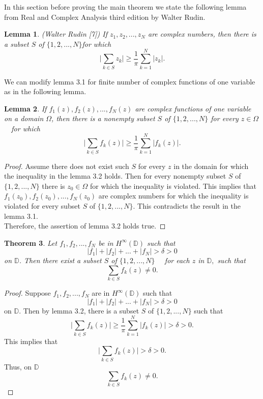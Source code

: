 \documentclass[reqno, 12pt]{amsart}
\newtheorem{theorem}{Theorem}[section]
\newtheorem{lemma}[theorem]{Lemma}
\theoremstyle{definition}
\theoremstyle{definition}
\begin{document}
In this section before proving the main theorem we state the following lemma from Real and Complex Analysis third edition by Walter Rudin. 
\begin{lemma}(Walter Rudin [7])
If $z_1, z_2, ..., z_N$ are complex numbers, then there is a subset $S$ of $ \{1, 2, ..., N\}$for which $$\lvert \sum_{k\in S}z_k\rvert \geq \frac{1}{\pi}\sum_{k=1}^N \lvert z_k\rvert.$$
\end{lemma}
We can modify lemma 3.1 for finite number of complex functions of one variable as in the following lemma.
\begin{lemma}
If $f_1(z), f_2(z),..., f_N(z)$ are complex functions of one variable on a domain $\Omega$, then there is a nonempty subset $S$ of $\{1, 2, ..., N\}$ for every $z\in\Omega$ ~~for which $$\lvert \sum_{k\in S}f_k(z)\rvert \geq \frac{1}{\pi}\sum_{k=1}^N \lvert f_k(z)\rvert.$$
\end{lemma}
\begin{proof}
Assume there does not exist such $S$ for every $z$ in the domain for which the inequality in the lemma 3.2 holds. Then for every nonempty subset $S$  of $\{1, 2, ..., N\}$ there is $z_0\in\Omega$ for which the inequality is violated. This implies that $f_1(z_0), f_2(z_0),..., f_N(z_0) $ are complex numbers for which the inequality is violated for every subset $S$ of $\{1, 2, ..., N\}.$
This contradicts the result in the lemma 3.1.\\
 Therefore, the assertion of lemma 3.2 holds true.
\end{proof}

\begin{theorem}
Let $f_1, f_2,...,f_N$ be in $H^\infty(\mathbb{D})$ such that $$\lvert f_1 \rvert+ \lvert f_2 \rvert +...+ \lvert f_N \rvert > \delta > 0$$ on $\mathbb{D}$. Then there exist a subset $S$ of $\{1, 2,..., N\}$ ~~for each $z$ in $\mathbb{D},$ such that $$\sum_{k\in S}f_k(z) \neq 0.$$ 
\end{theorem}

\begin{proof}
Suppose $f_1, f_2,...,f_N$ are in $H^\infty(\mathbb{D})$ such that $$\lvert f_1 \rvert+ \lvert f_2 \rvert +...+ \lvert f_N \rvert > \delta > 0$$ on $\mathbb{D}.$ Then by lemma 3.2, there is a subset $S$ of $\{1, 2, ..., N\}$ such that  $$\lvert \sum_{k\in S}f_k(z)\rvert \geq \frac{1}{\pi}\sum_{k=1}^N \lvert f_k(z)\rvert > \delta > 0 .$$
This implies that $$\lvert \sum_{k\in S}f_k(z)\rvert  > \delta > 0.$$ 
Thus, on $\mathbb{D}$ $$\sum_{k\in S}f_k(z) \neq 0.$$
\end{proof}
\bigskip
\end{document}
